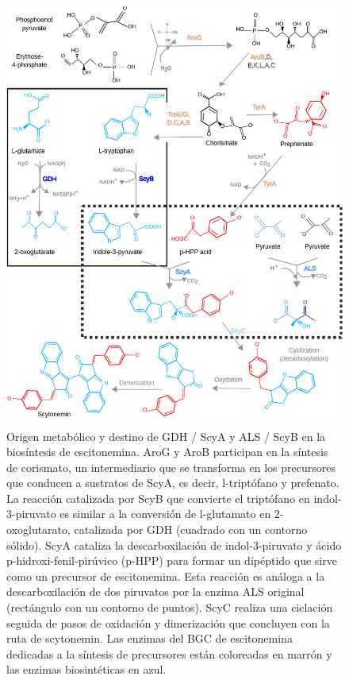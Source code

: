 \documentclass[12pt,twoside]{reedthesis}
\begin{document}
  \begin{figure}[h!tbp]
  \centering
  \includegraphics[angle = 0,scale = .8]{chapter2/FigurasPaper/Figure6.pdf}
  \caption[Origen metabólico y destino de GDH / ScyA y ALS / ScyB en la biosíntesis de escitonemina]{\footnotesize{Origen metabólico y destino de GDH / ScyA y ALS / ScyB en la biosíntesis de escitonemina. AroG y AroB participan en la síntesis de corismato, un intermediario que se transforma en los precursores que conducen a sustratos de ScyA, es decir, l-triptófano y prefenato. La reacción catalizada por ScyB que convierte el triptófano en indol-3-piruvato es similar a la conversión de l-glutamato en 2-oxoglutarato, catalizada por GDH (cuadrado con un contorno sólido). ScyA cataliza la descarboxilación de indol-3-piruvato y ácido p-hidroxi-fenil-pirúvico (p-HPP) para formar un dipéptido que sirve como un precursor de escitonemina. Esta reacción es análoga a la descarboxilación de dos piruvatos por la enzima ALS original (rectángulo con un contorno de puntos). ScyC realiza una ciclación seguida de pasos de oxidación y dimerización que concluyen con la ruta de scytonemin. Las enzimas del BGC de escitonemina dedicadas a la síntesis de precursores están coloreadas en marrón y las enzimas biosintéticas en azul.}}
  \label{fig:Ruta}
  \end{figure}
  
\end{document}
